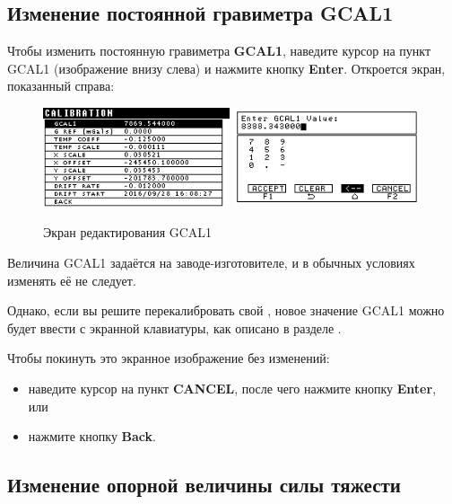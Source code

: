 \subsection[Изменение постоянной гравиметра]{Изменение постоянной гравиметра GCAL1}

Чтобы изменить постоянную гравиметра \textbf{GCAL1}, наведите курсор на пункт
GCAL1 (изображение внизу слева) и нажмите кнопку \textbf{Enter}. Откроется
экран, показанный справа:

\begin{figure}[H]
  \centering
  \includegraphics[width=0.49\textwidth]{figures/the_gcal1_editing_screen_1}
  \includegraphics[width=0.49\textwidth]{figures/the_gcal1_editing_screen_2}
  \caption{Экран редактирования GCAL1}
  \label{fig:the_gcal1_editing_screen}
\end{figure}

Величина GCAL1 задаётся на заводе-изготовителе, и в обычных условиях изменять её
не следует.

Однако, если вы решите перекалибровать свой \cg{}, новое значение GCAL1 можно
будет ввести с экранной клавиатуры, как описано в разделе
.

Чтобы покинуть это экранное изображение без изменений:
\begin{itemize}
  \item наведите курсор на пункт \textbf{CANCEL}, после чего нажмите кнопку
    \textbf{Enter}, или

  \item нажмите кнопку \textbf{Back}.
\end{itemize}

\subsection{Изменение опорной величины силы тяжести}

